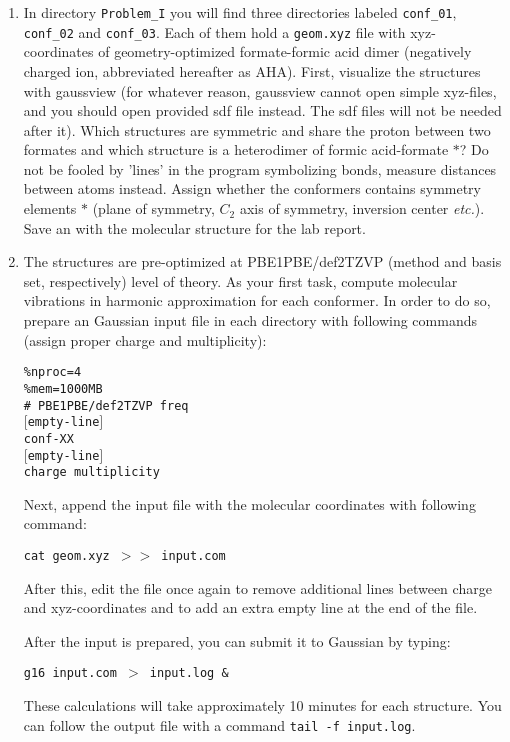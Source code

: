 \documentclass{tufte-handout}
\begin{document}
\begin{enumerate}
	\item In directory {\tt Problem\_I} you will find three directories labeled {\tt conf\_01}, {\tt conf\_02} and {\tt conf\_03}. Each of them hold a {\tt geom.xyz} file with xyz-coordinates of geometry-optimized formate-formic acid dimer (negatively charged ion, abbreviated hereafter as AHA). First, visualize the structures with gaussview (for whatever reason, gaussview cannot open simple xyz-files, and you should open provided sdf file instead. The sdf files will not be needed after it). Which structures are symmetric and share the proton between two formates and which structure is a heterodimer of formic acid-formate $*$? Do not be fooled by 'lines' in the program symbolizing bonds, measure distances between atoms instead.  Assign whether the conformers contains symmetry elements $*$ (plane of symmetry, $C_2$ axis of symmetry, inversion center {\it etc.}). Save an with the molecular structure for the lab report. 	
	
	\item The structures are pre-optimized at PBE1PBE/def2TZVP (method and basis set, respectively) level of theory. As your first task, compute molecular vibrations in harmonic approximation for each conformer. In order to do so, prepare an Gaussian input file in each directory with following commands (assign proper charge and multiplicity):
	
	{\tt \%nproc=4 \\
	     \%mem=1000MB \\
	     \# PBE1PBE/def2TZVP freq  \\
	     $[$empty-line$]$ \\
	     conf-XX      \\ 
	     $[$empty-line$]$ \\
	     charge multiplicity} 
	     
	Next, append the input file with the molecular coordinates with following command:
	
	{\tt cat geom.xyz $>>$ input.com }
	
	After this, edit the file once again to remove additional lines between charge and xyz-coordinates and to add an extra empty line at the end of the file. 
	
	After the input is prepared, you can submit it to Gaussian by typing:
	
	{\tt g16 input.com $>$ input.log \&}
	
	These calculations will take approximately 10 minutes for each structure. You can follow the output file with a command {\tt tail -f input.log}. 
	

\end{enumerate}
\end{document}

